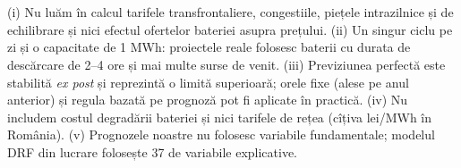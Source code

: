 \section{}
%
{(i) Nu luăm în calcul tarifele transfrontaliere, congestiile, piețele intrazilnice și de echilibrare și nici efectul ofertelor bateriei asupra prețului.
(ii) Un singur ciclu pe zi și o capacitate de 1 MWh: proiectele reale folosesc baterii cu durata de descărcare de 2--4 ore și mai multe surse de venit.
(iii) Previziunea perfectă este stabilită \emph{ex post} și reprezintă o limită superioară; orele fixe (alese pe anul anterior) și regula bazată pe prognoză pot fi aplicate în practică.
(iv) Nu includem costul degradării bateriei și nici tarifele de rețea (cîțiva lei/MWh în România).
(v) Prognozele noastre nu folosesc variabile fundamentale; modelul DRF din lucrare folosește 37 de variabile explicative.}

\newpage
